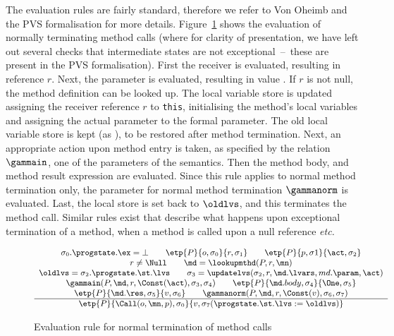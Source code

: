 The evaluation rules are fairly standard, therefore we refer to Von
Oheimb and the PVS formalisation for more details.
Figure~\ref{FigEvalRules} shows the evaluation of normally
terminating method calls (where for clarity of presentation, we have
left out several checks that intermediate states are not
exceptional~--~these are present in the PVS formalisation). First the
receiver is evaluated, resulting in reference \(r\). Next, the
parameter is evaluated, resulting in value \act. If \(r\) is not null,
the method definition
\md can be looked up. The local variable store is updated assigning
the receiver reference \(r\) to \texttt{this}, initialising the
method's local variables and assigning the actual parameter to the
formal parameter. The old local variable store is kept (as \oldlvs),
to be restored after method termination.
Next, an appropriate action
upon method entry is taken, as specified by the relation \(\gammain\),
one of the parameters of the semantics.
Then the method body, and method result
expression are evaluated. Since this rule applies to normal method
termination only, the parameter for normal method termination
\(\gammanorm\) is evaluated. Last, the local store is set back to
\(\oldlvs\),  and this terminates the method call. Similar rules
exist that describe what happens upon exceptional termination of a
method, when a method is called upon a null reference
\emph{etc.}



\begin{figure}[t]
\[{\small
\begin{array}{c}
\sigma_0.\progstate.\ex = \bot \qquad        %
\etp{P}{o, \sigma_0}{r,\sigma_1} \qquad      %
\etp{P}{p, \sigma1}{\act, \sigma_2}\\        %
r \not= \Null \qquad                         %
\md = \lookupmthd(P, r, \mn) \\
\oldlvs = \sigma_2.\progstate.\st.\lvs \qquad
\sigma_3 = \updatelvs(\sigma_2, r, \md.\lvars, md.\param, \act) \\
\gammain(P, \md, r, \Const(\act), \sigma_3, \sigma_4) \qquad
\etp{P}{\md.body, \sigma_4}{\One,\sigma_5} \\
\etp{P}{\md.\res, \sigma_5}{v,\sigma_6}\qquad
\gammanorm(P, \md, r, \Const(v), \sigma_6, \sigma_7)\\
\hline
\etp{P}{\Call(o,\mn,p), \sigma_0}{v, \sigma_7
(\progstate.\st.\lvs := \oldlvs)}
\end{array}}
\]
\caption{Evaluation rule for normal termination of method
calls}\label{FigEvalRules}
\end{figure}

